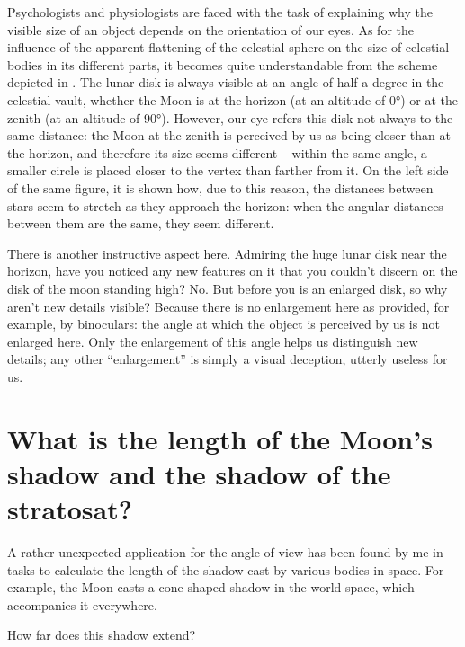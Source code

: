 Psychologists and physiologists are faced with the task of explaining why the visible size of an object depends on the orientation of our eyes. As for the influence of the apparent flattening of the celestial sphere on the size of celestial bodies in its different parts, it becomes quite understandable from the scheme depicted in . The lunar disk is always visible at an angle of half a degree in the celestial vault, whether the Moon is at the horizon (at an altitude of \ang{0}) or at the zenith (at an altitude of \ang{90}). However, our eye refers this disk not always to the same distance: the Moon at the zenith is perceived by us as being closer than at the horizon, and therefore its size seems different -- within the same angle, a smaller circle is placed closer to the vertex than farther from it. On the left side of the same figure, it is shown how, due to this reason, the distances between stars seem to stretch as they approach the horizon: when the angular distances between them are the same, they seem different.

There is another instructive aspect here. Admiring the huge lunar disk near the horizon, have you noticed any new features on it that you couldn't discern on the disk of the moon standing high? No. But before you is an enlarged disk, so why aren't new details visible? Because there is no enlargement here as provided, for example, by binoculars: the angle at which the object is perceived by us is not enlarged here. Only the enlargement of this angle helps us distinguish new details; any other ``enlargement'' is simply a visual deception, utterly useless for us.


\section[The length of the Moon's Shadow]{What is the length of the Moon's shadow and the shadow of the stratosat?}
\label{sec-3.14}

A rather unexpected application for the angle of view has been found by me in tasks to calculate the length of the shadow cast by various bodies in space. For example, the Moon casts a cone-shaped shadow in the world space, which accompanies it everywhere.

How far does this shadow extend?


